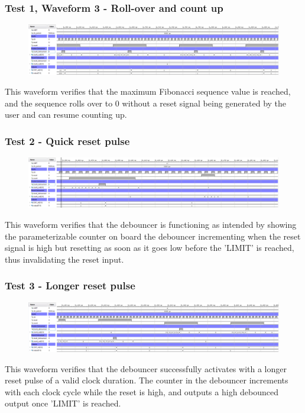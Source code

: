 \documentclass[11pt]{report}
\begin{document}
\subsubsection*{Test 1, Waveform 3 - Roll-over and count up}
\begin{figure}[H]
    \includegraphics[width=\columnwidth]{Reports/Lab1/Waveforms/04_roll-over-and-count.png}
\end{figure}
This waveform verifies that the maximum Fibonacci sequence value is reached, and the sequence rolls over to 0 without a reset signal being generated by the user and can resume counting up.

\subsubsection*{Test 2 - Quick reset pulse}
\begin{figure}[H]
    \includegraphics[width=\columnwidth]{Reports/Lab1/Waveforms/05_quick-reset-pulse.png}
\end{figure}
This waveform verifies that the debouncer is functioning as intended by showing the parameterizable counter on board the debouncer incrementing when the reset signal is high but resetting as soon as it goes low before the 'LIMIT' is reached, thus invalidating the reset input.

\subsubsection*{Test 3 - Longer reset pulse}
\begin{figure}[H]
    \includegraphics[width=\columnwidth]{Reports/Lab1/Waveforms/06_longer-reset-pulse.png}
\end{figure}
This waveform verifies that the debouncer successfully activates with a longer reset pulse of a valid clock duration. The counter in the debouncer increments with each clock cycle while the reset is high, and outputs a high debounced output once 'LIMIT' is reached.
\end{document}
